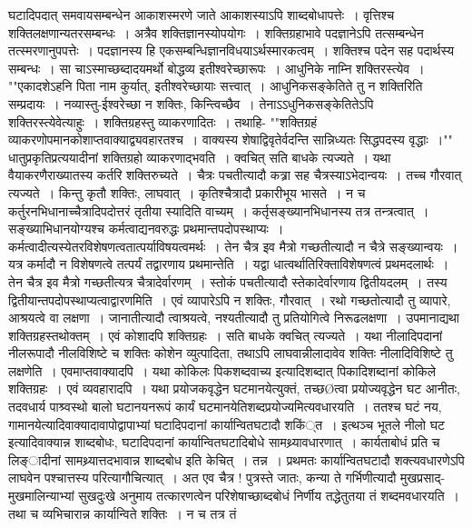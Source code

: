 घटादिपदात् समवायसम्बन्धेन आकाशस्मरणे जाते आकाशस्याऽपि शाब्दबोधापत्तेः~। वृत्तिश्च शक्तिलक्षणान्यतरसम्बन्धः~। अत्रैव शक्तिज्ञानस्योपयोगः~। शक्तिग्रहाभावे
पदज्ञानेऽपि तत्सम्बन्धेन तत्स्मरणानुपपत्तेः~। पदज्ञानस्य हि एकसम्बन्धिज्ञानविधयाऽर्थस्मारकत्वम्~।
शक्तिश्च पदेन सह पदार्थस्य सम्बन्धः~। सा चाऽस्माच्छब्दादयमर्थो बोद्धव्य इतीश्वरेच्छारूपः~। आधुनिके नाम्नि शक्तिरस्त्येव~। ""एकादशेऽहनि पिता नाम कुर्यात्,
इतीश्वरेच्छायाः सत्त्वात्~। आधुनिकसङ्केतिते तु न शक्तिरिति सम्प्रदायः~।
नव्यास्तु-ईश्वरेच्छा न शक्तिः, किन्त्विच्छैव~। तेनाऽऽधुनिकसङ्केतितेऽपि शक्तिरस्त्येवेत्याहुः~।
शक्तिग्रहस्तु व्याकरणादितः~। तथाहि-
""शक्तिग्रहं व्याकरणोपमानकोशाप्तवाक्याद्व्यवहारतश्च~।
वाक्यस्य शेषाद्विवृतेर्वदन्ति सान्निध्यतः सिद्धपदस्य वृद्धाः~।""
धातुप्रकृतिप्रत्ययादीनां शक्तिग्रहो व्याकरणाद्भवति~। क्वचित् सति बाधके त्यज्यते~। यथा वैयाकरणैराख्यातस्य कर्तरि शक्तिरुच्यते~। चैत्रः पचतीत्यादौ कत्र्रा सह
चैत्रस्याऽभेदान्वयः~। तच्च गौरवात् त्यज्यते~। किन्तु कृतौ शक्तिः, लाघवात्~। कृतिश्चैत्रादौ प्रकारीभूय भासते~।
न च कर्तुरनभिधानाच्चैत्रादिपदोत्तरं तृतीया स्यादिति वाच्यम्~। कर्तृसङ्ख्यानभिधानस्य तत्र तन्त्रत्वात्~।
सङ्ख्याभिधानयोग्यश्च कर्मत्वाद्यनवरुद्धः प्रथमान्तपदोपस्थाप्यः~। कर्मत्वादीत्यस्येतरविशेषणत्वतात्पर्याविषयत्वमर्थः~। तेन चैत्र इव मैत्रो गच्छतीत्यादौ न चैत्रे
सङ्ख्यान्वयः~। यत्र कर्मादौ न विशेषणत्वे तत्पर्यं तद्वारणाय प्रथमान्तेति~।
यद्वा धात्वर्थातिरिक्ताविशेषणत्वं प्रथमदलार्थः~। तेन चैत्र इव मैत्रो गच्छतीत्यत्र चैत्रादेर्वारणम्~। स्तोकं पचतीत्यादौ स्तेकादेर्वारणाय द्वितीयदलम्~। तस्य
द्वितीयान्तपदोपस्थाप्यत्वाद्वारणमिति~।
एवं व्यापारेऽपि न शक्तिः, गौरवात्~। रथो गच्छतोत्यादौ तु व्यापारे, आश्रयत्वे वा लक्षणा~। जानातीत्यादौ त्वाश्रयत्वे, नश्यतीत्यादौ तु प्रतियोगित्वे निरूढलक्षणा~।
उपमानाद्यथा शक्तिग्रहस्तथोक्तम्~।
एवं कोशादपि शक्तिग्रहः~। सति बाधके क्वचित् त्यज्यते~। यथा नीलादिपदानां नीलरूपादौ नीलविशिष्टे च शक्तिः कोशेन व्युत्पादिता, तथाऽपि लाघवान्नीलादावेव
शक्तिः नीलादिविशिष्टे तु लक्षणेति~।
एवमाप्तवाक्यादपि~। यथा कोकिलः पिकशब्दवाच्य इत्यादिशब्दात् पिकादिशब्दानां कोकिले शक्तिग्रहः~।
एवं व्यवहारादपि~। यथा प्रयोजकवृद्धेन घटमानयेत्युक्तं, तच्छØत्वा प्रयोज्यवृद्धेन घट आनीतः, तदवधार्य पाश्र्वस्थो बालो घटानयनरूपं कार्यं
घटमानयेतिशब्दप्रयोज्यमित्यवधारयति~। ततश्च घटं नय, गामानयेत्यादिवाक्यादावापोद्वापाभ्यां घटादिपदानां कार्यान्वितघटादौ शकिं्त~।
इत्थञ्च भूतले नीलो घट इत्यादिवाक्यान्न शाब्दबोधः, घटादिपदानां कार्यान्वितघटादिबोधे सामथ्र्यावधारणात्~। कार्यताबोधं प्रति च लिङ्ादीनां सामथ्र्यात्तदभावान्न
शाब्दबोध इति केचित्~।
तन्न~। प्रथमतः कार्यान्वितघटादौ शक्त्यवधारणेऽपि लाघवेन पश्चात्तस्य परित्यागौचित्यात्~। अत एव चैत्र ! पुत्रस्ते जातः, कन्या ते गर्भिणीत्यादौ मुखप्रसाद्-
मुखमालिन्याभ्यां सुखदुःखे अनुमाय तत्कारणत्वेन परिशेषाच्छाब्दबोधं निर्णीय तद्धेतुतया तं शब्दमवधारयति~। तथा च व्यभिचारान्न कार्यान्विते शक्तिः~। न च तत्र तं
